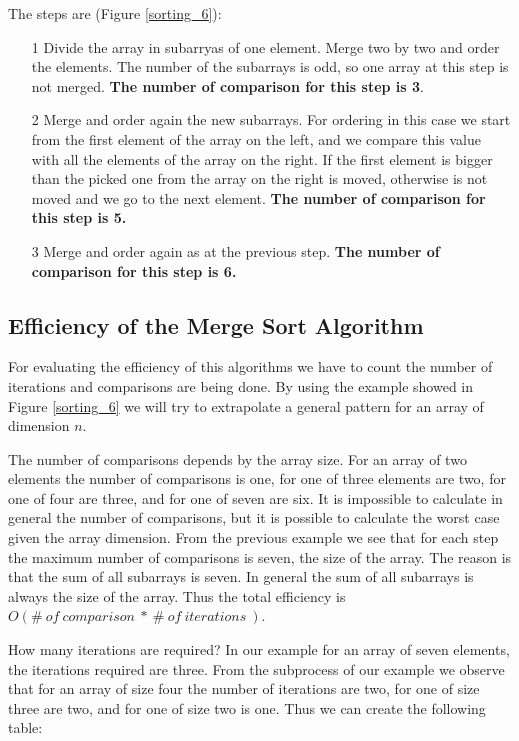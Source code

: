 The steps are (Figure \ref{sorting_6}): 
\begin{itemize}
\item[1] Divide the array in subarryas of one element. Merge two by two and order the elements. The number of the subarrays is odd, so one array at this step is not merged. \textbf{The number of comparison for this step is 3}.
\item[2] Merge and order again the new subarrays. For ordering in this case we start from the first element of the array on the left, and we compare this value with all the elements of the array on the right. If the first element is bigger than the picked one from the array on the right is moved, otherwise is not moved and we go to the next element. \textbf{The number of comparison for this step is 5.}   
\item[3] Merge and order again as at the previous step. \textbf{The number of comparison for this step is 6.}
\end{itemize}

\subsection{Efficiency of the Merge Sort Algorithm}
For evaluating the efficiency of this algorithms we have to count the number of iterations and comparisons are being done. By using the example showed in Figure \ref{sorting_6} we will try to extrapolate a general pattern for an array of dimension \(n\).

The number of comparisons depends by the array size. For an array of two elements the number of comparisons is one, for one of three elements are two, for one of four are three, and for one of seven are six. It is impossible to calculate in general the number of comparisons, but it is possible to calculate the worst case given the array dimension. From the previous example we see that for each step the maximum number of comparisons is seven, the size of the array. The reason is that the sum of all subarrays is seven. In general the sum of all subarrays is always the size of the array. Thus the total efficiency is \(O(\# \ of\ comparison \ * \ \# \ of \ iterations \ )\).

How many iterations are required? In our example for an array of seven elements, the iterations required are three. From the subprocess of our example we observe that for an array of size four the number of iterations are two, for one of size three are two, and for one of size two is one. Thus we can create the following table:

